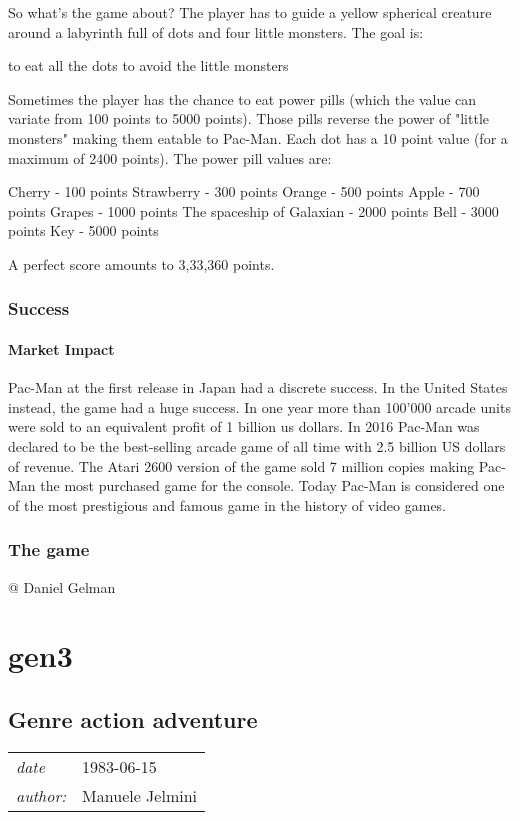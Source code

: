 \documentclass[a4paper,10pt]{book}
\newcommand{\pageHeader}[4]{
    \section{#1}
    \vspace{-0.3cm}
    \begin{table}[h!]
     \begin{tabular}{ll}
        \hline
        \textit{date} & #2 \\
        \textit{author: } & #3\\
        \hline
     \end{tabular}
    \end{table}
    \vspace{-0.3cm}
}
\begin{document}
                So what's the game about?   The player has to guide a yellow spherical creature around a labyrinth full of dots and four little monsters. The goal is:
                 
 to eat all the dots 
 to avoid the little monsters 
 
                Sometimes the player has the chance to eat power pills (which the value can variate from 100 points to 5000 points). Those pills reverse the power of "little monsters" making them eatable to Pac-Man. Each dot has a 10 point value (for a maximum of 2400
                points). The power pill values are:
                 
 Cherry - 100 points 
 Strawberry - 300 points 
 Orange - 500 points 
 Apple - 700 points 
 Grapes - 1000 points 
 The spaceship of Galaxian - 2000 points 
 Bell - 3000 points 
 Key - 5000 points 
 
                A perfect score amounts to 3,33,360 points.
             
 
 \subsection{Success }
 \subsubsection{Market Impact }
            Pac-Man at the first release in Japan had a discrete success. In the United States instead, the game had a huge success.   In one year more than 100'000 arcade units were sold to an equivalent profit of 1 billion us dollars. In 2016 Pac-Man
            was declared to be the best-selling arcade game of all time with 2.5 billion US dollars of revenue. The Atari 2600 version of the game sold 7 million copies making Pac-Man the most purchased game for the console. Today Pac-Man is considered
            one of the most prestigious and famous game in the history of video games.
               \textbf{}   \textit{}
 
 \subsection{The game }
 
 
 
 
 @ Daniel Gelman 
 
 
 \newpage\chapter{gen3}\newpage\pageHeader{Genre action adventure}{1983-06-15}{Manuele Jelmini}{The action-adventure genre in the third generation}
\end{document}
